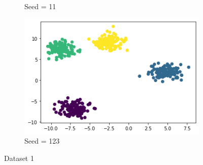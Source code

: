 \documentclass[12pt, fleqn]{article}
\begin{document}
\begin{figure}[H]
\begin{subfigure}[H]{0.35\textwidth}
        \caption[]{Seed = 11}
    \end{subfigure}
    \begin{subfigure}[H]{0.35\textwidth}
        \centering
        \includegraphics[width=\textwidth]{plots/D1/123.png}
        \caption[]{Seed = 123}
    \end{subfigure}
    \caption[]{Dataset 1}
\end{figure}
\end{document}
